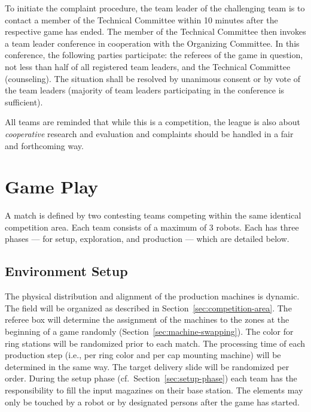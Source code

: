 \documentclass[12pt,twoside]{article}
\newcommand{\refsec}[1]{Section~\ref{#1}}
\begin{document}
To initiate the complaint procedure, the team leader of the
challenging team is to contact a member of the Technical Committee
within 10 minutes after the respective game has ended. The member of
the Technical Committee then invokes a team leader conference in
cooperation with the Organizing Committee. In this conference, the
following parties participate: the referees of the game in question,
not less than half of all registered team leaders, and the Technical
Committee (counseling). The situation shall be resolved by unanimous
consent or by vote of the team leaders (majority of team leaders
participating in the conference is sufficient).

All teams are reminded that while this is a competition, the league is
also about \emph{cooperative} research and evaluation and complaints
should be handled in a fair and forthcoming way.

\section{Game Play}
A match is defined by two contesting teams competing within the same
identical competition area. Each team consists of a maximum of 3
robots. Each has three phases --- for setup, exploration, and
production --- which are detailed below.

\subsection{Environment Setup}
\label{sec:env-setup}
The physical distribution and alignment of the production machines is
dynamic. The field will be organized as described in
\refsec{sec:competition-area}. The referee box will determine the
assignment of the machines to the zones at the beginning of a game
randomly (\refsec{sec:machine-swapping}).
The color for ring stations will be
randomized prior to each match. The processing time of each production
step (i.e., per ring color and per cap mounting machine) will be
determined in the same way. The target delivery slide will be
randomized per order. During the setup phase
(cf.~\refsec{sec:setup-phase}) each team has the responsibility to
fill the input magazines on their base station. The elements may only
be touched by a robot or by designated persons after the game has
started.

\end{document}
